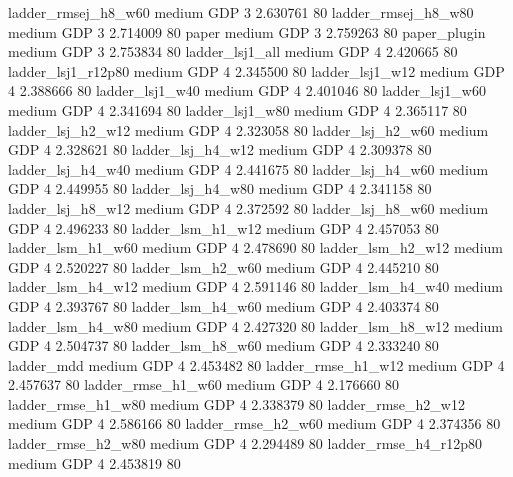    ladder_rmsej_h8_w60     medium      GDP                 3 2.630761 80
   ladder_rmsej_h8_w80     medium      GDP                 3 2.714009 80
                 paper     medium      GDP                 3 2.759263 80
          paper_plugin     medium      GDP                 3 2.753834 80
       ladder_lsj1_all     medium      GDP                 4 2.420665 80
    ladder_lsj1_r12p80     medium      GDP                 4 2.345500 80
       ladder_lsj1_w12     medium      GDP                 4 2.388666 80
       ladder_lsj1_w40     medium      GDP                 4 2.401046 80
       ladder_lsj1_w60     medium      GDP                 4 2.341694 80
       ladder_lsj1_w80     medium      GDP                 4 2.365117 80
     ladder_lsj_h2_w12     medium      GDP                 4 2.323058 80
     ladder_lsj_h2_w60     medium      GDP                 4 2.328621 80
     ladder_lsj_h4_w12     medium      GDP                 4 2.309378 80
     ladder_lsj_h4_w40     medium      GDP                 4 2.441675 80
     ladder_lsj_h4_w60     medium      GDP                 4 2.449955 80
     ladder_lsj_h4_w80     medium      GDP                 4 2.341158 80
     ladder_lsj_h8_w12     medium      GDP                 4 2.372592 80
     ladder_lsj_h8_w60     medium      GDP                 4 2.496233 80
     ladder_lsm_h1_w12     medium      GDP                 4 2.457053 80
     ladder_lsm_h1_w60     medium      GDP                 4 2.478690 80
     ladder_lsm_h2_w12     medium      GDP                 4 2.520227 80
     ladder_lsm_h2_w60     medium      GDP                 4 2.445210 80
     ladder_lsm_h4_w12     medium      GDP                 4 2.591146 80
     ladder_lsm_h4_w40     medium      GDP                 4 2.393767 80
     ladder_lsm_h4_w60     medium      GDP                 4 2.403374 80
     ladder_lsm_h4_w80     medium      GDP                 4 2.427320 80
     ladder_lsm_h8_w12     medium      GDP                 4 2.504737 80
     ladder_lsm_h8_w60     medium      GDP                 4 2.333240 80
            ladder_mdd     medium      GDP                 4 2.453482 80
    ladder_rmse_h1_w12     medium      GDP                 4 2.457637 80
    ladder_rmse_h1_w60     medium      GDP                 4 2.176660 80
    ladder_rmse_h1_w80     medium      GDP                 4 2.338379 80
    ladder_rmse_h2_w12     medium      GDP                 4 2.586166 80
    ladder_rmse_h2_w60     medium      GDP                 4 2.374356 80
    ladder_rmse_h2_w80     medium      GDP                 4 2.294489 80
 ladder_rmse_h4_r12p80     medium      GDP                 4 2.453819 80
